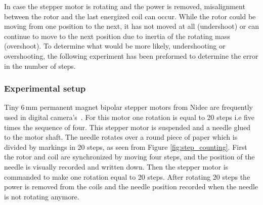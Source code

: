 In case the stepper motor is rotating and the power is removed, misalignment between the rotor and the last energized coil can occur.
While the rotor could be moving from one position to the next, it has not moved at all (undershoot) or can continue to move to the next position due to inertia of the rotating mass (overshoot). 
To determine what would be more likely, undershooting or overshooting, the following experiment has been preformed to determine the error in the number of steps.

\subsubsection{Experimental setup}

Tiny 6\,mm permanent magnet bipolar stepper motors from Nidec are frequently used in digital camera's~\cite{nidec_stepper_2017}.
For this motor one rotation is equal to 20 steps i.e five times the sequence of four.
This stepper motor is suspended and a needle glued to the motor shaft.
The needle rotates over a round piece of paper which is divided by markings in 20 steps, as seen from Figure \ref{fig:step_counting}.
First the rotor and coil are synchronized by moving four steps, and the position of the needle is visually recorded and written down.  
Then the stepper motor is commanded to make one rotation equal to 20 steps.
After rotating 20 steps the power is removed from the coils and the needle position recorded when the needle is not rotating anymore.

